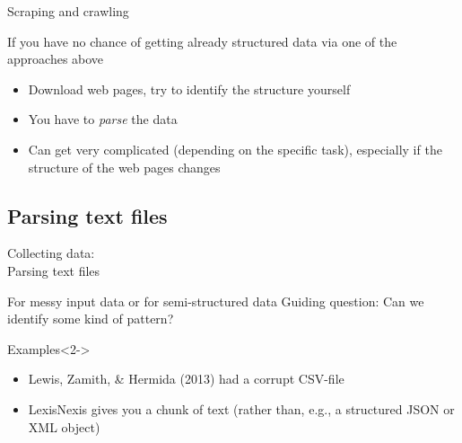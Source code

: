 \documentclass{beamer}
\begin{document}
\begin{frame}{Scraping and crawling}
\begin{block}{If you have no chance of getting already structured data via one of the approaches above}
\begin{itemize}
\item<2->Download web pages, try to identify the structure yourself
\item<2->You have to \emph{parse} the data
\item<3-> Can get very complicated (depending on the specific task), especially if the structure of the web pages changes
\end{itemize}
\end{block}
\end{frame}





\subsection{Parsing text files}
\begin{frame}
Collecting data:\\
Parsing text files
\end{frame}

\begin{frame}{For messy input data or for semi-structured data}
Guiding question: Can we identify some kind of pattern?
\begin{block}{Examples}<2->
\begin{itemize}
\item<2-> Lewis, Zamith, \& Hermida (2013) had a corrupt CSV-file
\item<3-> LexisNexis gives you a chunk of text (rather than, e.g., a structured JSON or XML object)
\end{itemize}
\end{block}
~\\

\end{frame}
\end{document}
